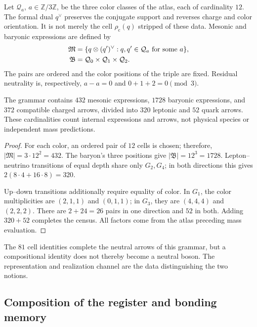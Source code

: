 Let \(\mathcal Q_a\), \(a\in\mathbb Z/3\mathbb Z\), be the three
color classes of the atlas, each of cardinality \(12\). The formal dual
\(q^\vee\) preserves the conjugate support and reverses charge
and color orientation. It is not merely the cell \(\rho_{\mathrm c}(q)\) stripped
of these data. Mesonic and baryonic expressions are defined by
\begin{align}
 \mathfrak M&=\{q\otimes(q')^\vee:
 q,q'\in\mathcal Q_a\text{ for some }a\},\notag\\
 \mathfrak B&=\mathcal Q_0\times\mathcal Q_1\times\mathcal Q_2.
 \label{vi:vi:eq:gramatica-meson-barion}
\end{align}
The pairs are ordered and the color positions of the triple are
fixed. Residual neutrality is, respectively,
\(a-a=0\) and \(0+1+2=0\pmod3\).

\begin{proposition}
\label{vi:vi:prop:censo-compuestos}
The grammar contains \(432\) mesonic expressions, \(1728\)
baryonic expressions, and \(372\) compatible charged arrows, divided
into \(320\) leptonic and \(52\) quark arrows. These cardinalities count
internal expressions and arrows, not physical species or independent
mass predictions.
\end{proposition}
\begin{proof}
For each color, an ordered pair of \(12\) cells is chosen; therefore,
\(|\mathfrak M|=3\cdot12^2=432\). The baryon's three positions give
\(|\mathfrak B|=12^3=1728\). Lepton--neutrino transitions of
equal depth share only \(G_2,G_4\); in both directions this
gives \(2(8\cdot4+16\cdot8)=320\).

Up--down transitions additionally require equality of color.
In \(G_1\), the color multiplicities are \((2,1,1)\) and
\((0,1,1)\); in \(G_3\), they are \((4,4,4)\) and \((2,2,2)\).
There are \(2+24=26\) pairs in one direction and \(52\) in both. Adding
\(320+52\) completes the census. All factors come from the atlas
preceding mass evaluation.
\end{proof}

The \(81\) cell identities complete the neutral arrows
of this grammar, but a compositional identity does not thereby become
a neutral boson. The representation and realization channel
are the data distinguishing the two notions.

\subsection{Composition of the register and bonding memory}
\label{vi:vi:subsec:composicion-registro}

